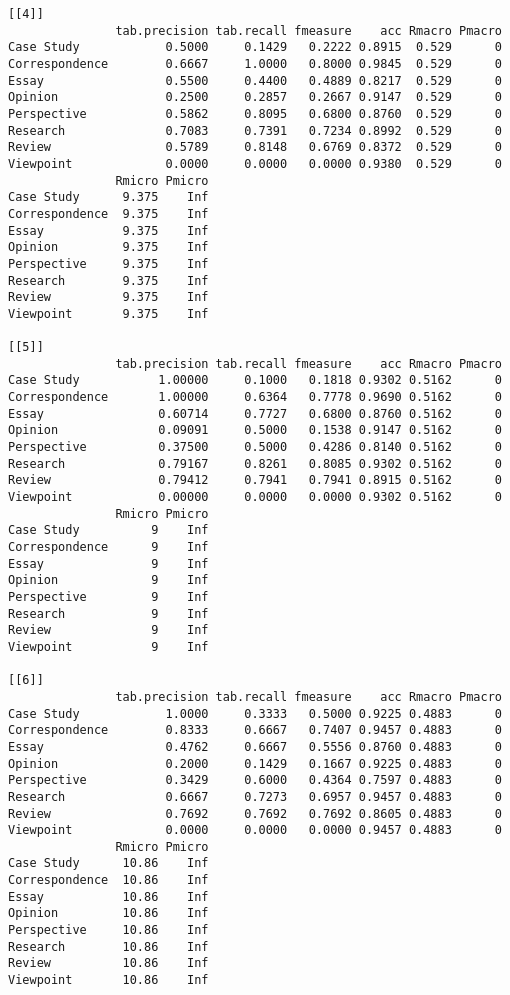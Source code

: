 \documentclass[]{article}
\begin{document}
\begin{lstlisting}[frame=single]
[[4]]
               tab.precision tab.recall fmeasure    acc Rmacro Pmacro
Case Study            0.5000     0.1429   0.2222 0.8915  0.529      0
Correspondence        0.6667     1.0000   0.8000 0.9845  0.529      0
Essay                 0.5500     0.4400   0.4889 0.8217  0.529      0
Opinion               0.2500     0.2857   0.2667 0.9147  0.529      0
Perspective           0.5862     0.8095   0.6800 0.8760  0.529      0
Research              0.7083     0.7391   0.7234 0.8992  0.529      0
Review                0.5789     0.8148   0.6769 0.8372  0.529      0
Viewpoint             0.0000     0.0000   0.0000 0.9380  0.529      0
               Rmicro Pmicro
Case Study      9.375    Inf
Correspondence  9.375    Inf
Essay           9.375    Inf
Opinion         9.375    Inf
Perspective     9.375    Inf
Research        9.375    Inf
Review          9.375    Inf
Viewpoint       9.375    Inf

[[5]]
               tab.precision tab.recall fmeasure    acc Rmacro Pmacro
Case Study           1.00000     0.1000   0.1818 0.9302 0.5162      0
Correspondence       1.00000     0.6364   0.7778 0.9690 0.5162      0
Essay                0.60714     0.7727   0.6800 0.8760 0.5162      0
Opinion              0.09091     0.5000   0.1538 0.9147 0.5162      0
Perspective          0.37500     0.5000   0.4286 0.8140 0.5162      0
Research             0.79167     0.8261   0.8085 0.9302 0.5162      0
Review               0.79412     0.7941   0.7941 0.8915 0.5162      0
Viewpoint            0.00000     0.0000   0.0000 0.9302 0.5162      0
               Rmicro Pmicro
Case Study          9    Inf
Correspondence      9    Inf
Essay               9    Inf
Opinion             9    Inf
Perspective         9    Inf
Research            9    Inf
Review              9    Inf
Viewpoint           9    Inf

[[6]]
               tab.precision tab.recall fmeasure    acc Rmacro Pmacro
Case Study            1.0000     0.3333   0.5000 0.9225 0.4883      0
Correspondence        0.8333     0.6667   0.7407 0.9457 0.4883      0
Essay                 0.4762     0.6667   0.5556 0.8760 0.4883      0
Opinion               0.2000     0.1429   0.1667 0.9225 0.4883      0
Perspective           0.3429     0.6000   0.4364 0.7597 0.4883      0
Research              0.6667     0.7273   0.6957 0.9457 0.4883      0
Review                0.7692     0.7692   0.7692 0.8605 0.4883      0
Viewpoint             0.0000     0.0000   0.0000 0.9457 0.4883      0
               Rmicro Pmicro
Case Study      10.86    Inf
Correspondence  10.86    Inf
Essay           10.86    Inf
Opinion         10.86    Inf
Perspective     10.86    Inf
Research        10.86    Inf
Review          10.86    Inf
Viewpoint       10.86    Inf


\end{lstlisting}
\end{document}
